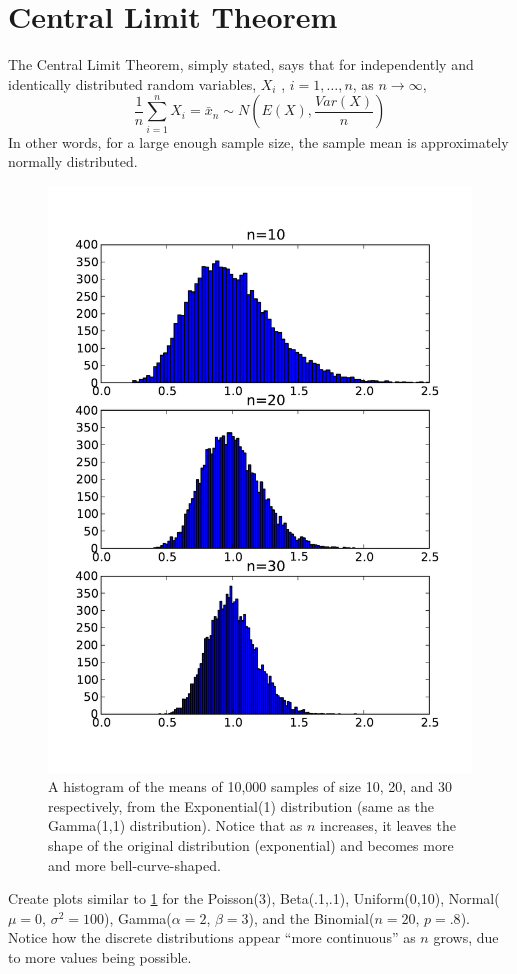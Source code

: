 \section*{Central Limit Theorem}
The Central Limit Theorem, simply stated, says that for independently and identically distributed random variables, $X_i$ , $i = 1, \dots, n$, as $n \rightarrow \infty$,
\[ 
\frac{1}{n} \sum^n_{i=1} X_i = \bar{x}_n \sim N\left(E(X), \frac{Var(X)}{n}\right)
\]
In other words, for a large enough sample size, the sample mean is approximately normally distributed. 
\begin{figure}[h]
\includegraphics[width=\textwidth]{multiplot.pdf}
\caption{A histogram of the means of 10,000 samples of size 10, 20, and 30 respectively, from the Exponential(1) distribution (same as the Gamma(1,1) distribution). Notice that as $n$ increases, it leaves the shape of the original distribution (exponential) and becomes more and more bell-curve-shaped.}
\label{fig:CLT}
\end{figure}

\begin{problem}
Create plots similar to \ref{fig:CLT} for the Poisson(3), Beta(.1,.1), Uniform(0,10), Normal($\mu=0$, $\sigma^2=100$), Gamma($\alpha = 2$, $\beta = 3$), and the Binomial($n=20$, $p=.8$). Notice how the discrete distributions appear ``more continuous'' as $n$ grows, due to more values being possible. 
\end{problem}
